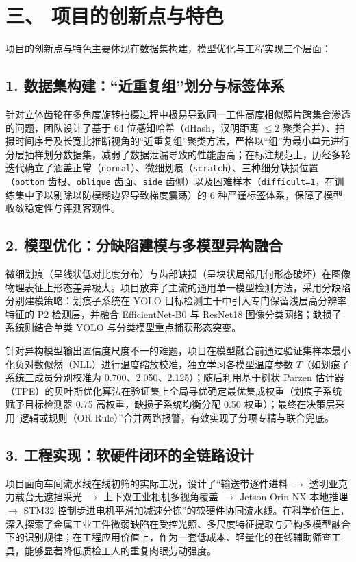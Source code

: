 \section*{三、 项目的创新点与特色}

项目的创新点与特色主要体现在数据集构建，模型优化与工程实现三个层面：

\subsection*{1. 数据集构建：“近重复组”划分与标签体系}
针对立体齿轮在多角度旋转拍摄过程中极易导致同一工件高度相似照片跨集合渗透的问题，团队设计了基于 64 位感知哈希（dHash，汉明距离 $\le 2$ 聚类合并）、拍摄时间序号及长宽比推断视角的“近重复组”聚类方法，严格以“组”为最小单元进行分层抽样划分数据集，减弱了数据泄漏导致的性能虚高；在标注规范上，历经多轮迭代确立了涵盖正常（\texttt{normal}）、微细划痕（\texttt{scratch}）、三种细分缺损位置（\texttt{bottom} 齿根、\texttt{oblique} 齿面、\texttt{side} 齿侧）以及困难样本（\texttt{difficult=1}，在训练集中予以剔除以防模糊边界导致梯度震荡）的 6 种严谨标签体系，保障了模型收敛稳定性与评测客观性。

\subsection*{2. 模型优化：分缺陷建模与多模型异构融合}
微细划痕（呈线状低对比度分布）与齿部缺损（呈块状局部几何形态破坏）在图像物理表征上形态差异极大。项目放弃了主流的通用单一模型检测方法，采用分缺陷分别建模策略：划痕子系统在 YOLO 目标检测主干中引入专门保留浅层高分辨率特征的 P2 检测层，并融合 EfficientNet-B0 与 ResNet18 图像分类网络；缺损子系统则结合单类 YOLO 与分类模型重点捕获形态突变。

针对异构模型输出置信度尺度不一的难题，项目在模型融合前通过验证集样本最小化负对数似然（NLL）进行温度缩放校准，独立学习各模型温度参数 $T$（如划痕子系统三成员分别校准为 0.700、2.050、2.125）；随后利用基于树状 Parzen 估计器（TPE）的贝叶斯优化算法在验证集上全局寻优确定最优集成权重（划痕子系统赋予目标检测器 0.75 高权重，缺损子系统均衡分配 0.50 权重）；最终在决策层采用“逻辑或规则（OR Rule）”合并两路报警，有效实现了分项专精与联合兜底。

\subsection*{3. 工程实现：软硬件闭环的全链路设计}
项目面向车间流水线在线初筛的实际工况，设计了“输送带逐件进料 $\rightarrow$ 透明亚克力载台无遮挡采光 $\rightarrow$ 上下双工业相机多视角覆盖 $\rightarrow$ Jetson Orin NX 本地推理 $\rightarrow$ STM32 控制步进电机平滑加减速分拣”的软硬件协同流水线。在科学价值上，深入探索了金属工业工件微弱缺陷在受控光照、多尺度特征提取与异构多模型融合下的识别规律；在工程应用价值上，作为一套低成本、轻量化的在线辅助筛查工具，能够显著降低质检工人的重复肉眼劳动强度。

